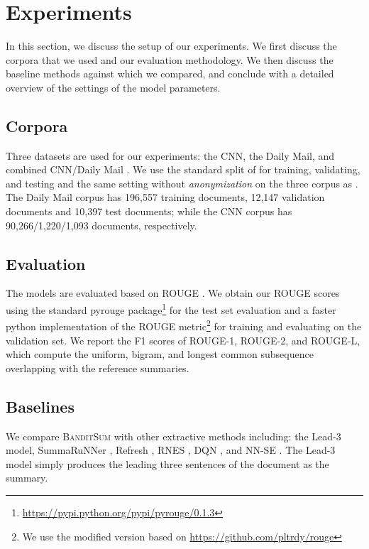 \documentclass[11pt,a4paper]{article}
\newcommand{\B}{\textsc{BanditSum }}
\begin{document}
\section{Experiments\label{sec:experiments}}
In this section, we discuss the setup of our experiments. We first discuss the corpora that we used and our evaluation methodology. We then discuss the baseline methods against which we compared, and conclude with a detailed overview of the settings of  the model parameters. 
\subsection{Corpora}
Three datasets are used for our experiments: the CNN, the Daily Mail, and combined CNN/Daily Mail \citep{data1_hermann2015teaching,data2_nallapati2016abstractive}. We use the standard split of \citet{data1_hermann2015teaching} for training, validating, and testing and the same setting without \textit{anonymization} on the three corpus as \citet{abs4_SeeLM17}. The Daily Mail corpus has 196,557 training documents, 12,147 validation documents and 10,397 test documents; while the CNN corpus has 90,266/1,220/1,093 documents, respectively. 





\subsection{Evaluation}
The models are evaluated based on ROUGE \cite{eva1_lin:2004:ACLsummarization}.
We obtain our ROUGE scores using the standard pyrouge
package\footnote{\url{https://pypi.python.org/pypi/pyrouge/0.1.3}} for the test set evaluation and a faster python implementation of the ROUGE metric\footnote{We use the modified version based on \url{https://github.com/pltrdy/rouge}}
for training and evaluating on the validation set. We report the F1 scores of ROUGE-1, ROUGE-2, and ROUGE-L, which compute the uniform, bigram, and longest common subsequence overlapping with the reference summaries.  



\subsection{Baselines}
We compare \B with other extractive methods including: the Lead-3 model, SummaRuNNer \citep{ext5_summarunner}, Refresh \citep{DBLP:Narayan/2018}, RNES \citep{DBLP:conf/aaai/WuH18}, DQN \citep{yao2018deep}, and NN-SE \citep{ext4_cheng2016neural}.  The Lead-3 model simply produces the leading three sentences of the document as the summary. 
\end{document}
